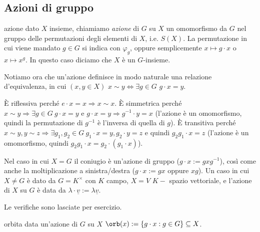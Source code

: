\subsection{Azioni di gruppo}
\begin{definition}{azione}
    dato $X$ insieme, chiamiamo \emph{azione} di $G$ su $X$ un omomorfismo da $G$ nel gruppo delle permutazioni degli elementi di $X$, i.e. $S(X)$. La permutazione in cui viene mandato $g \in G$ si indica con $\varphi_g$, oppure semplicemente $x \mapsto g\cdot x$ o $x \mapsto x^g$. In questo caso diciamo che $X$ è un $G$-insieme.
\end{definition}

Notiamo ora che un'azione definisce in modo naturale una relazione d'equivalenza, in cui $(x,y \in X)$ $x \sim y \iff \exists g \in G$ $g\cdot x = y$. 
\begin{bdef}
    È riflessiva perché $e\cdot x = x \Rightarrow x \sim x$. È simmetrica perché $x \sim y \Rightarrow \exists g\in G \ g\cdot x = y$ e $g\cdot x = y \Rightarrow g^{-1} \cdot y = x$ (l'azione è un omomorfismo, quindi la permutazione di $g^{-1}$ è l'inversa di quella di $g$). È transitiva perché $x \sim y, y \sim z \Rightarrow \exists g_1,g_2\in G \ g_1\cdot x = y, g_2\cdot y = z$ e quindi $g_2g_1 \cdot x = z$ (l'azione è un omomorfismo, quindi $g_2g_1 \cdot x = g_2 \cdot(g_1 \cdot x)$).
\end{bdef}
\begin{example} Nel caso in cui $X=G$ il coniugio è un'azione di gruppo ($g \cdot x := gxg^{-1}$), così come anche la moltiplicazione a sinistra/destra ($g \cdot x := gx$ oppure $xg$). Un caso in cui $X \neq G$ è dato da $G = K^\times$ con $K$ campo, $X = V$ $K-$ spazio vettoriale, e l'azione di $X$ su $G$ è data da $\lambda \cdot \underline{v} :=  \lambda \underline{v} $.

Le verifiche sono lasciate per esercizio.
\end{example}

\begin{definition}{orbita}
    data un'azione di $G$ su $X$  $\orb(x) := \{g \cdot x : g\in G\} \subseteq X$.
\end{definition} 

